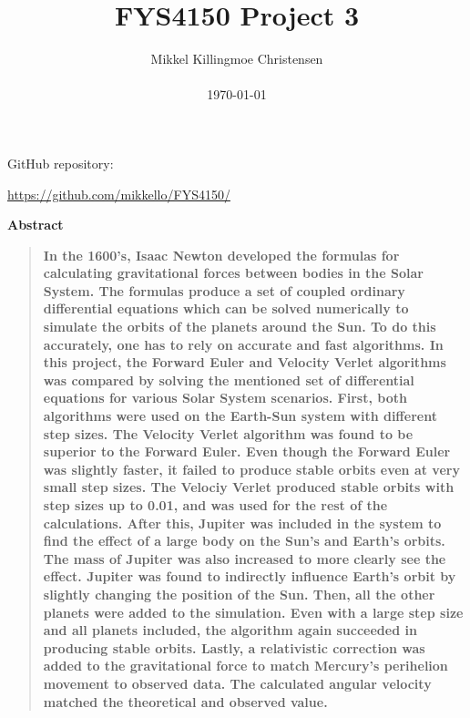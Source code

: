 \documentclass[10pt,a4paper,titlepage]{article}
\title{FYS4150 Project 3}
\author
{Mikkel Killingmoe Christensen\\
\\
\normalsize{\today}
}
\date{}
\newenvironment{sciabstract}{%
\begin{quote} \bf}
{\end{quote}}
\begin{document}
 




\maketitle 
\begin{center}
\par GitHub repository:
\par \url{https://github.com/mikkello/FYS4150/}
\end{center}



\begin{center}
{\large \textbf{Abstract}}
\end{center}
\begin{sciabstract}
In the 1600's, Isaac Newton developed the formulas for calculating gravitational forces between bodies in the Solar System. The formulas produce a set of coupled ordinary differential equations which can be solved numerically to simulate the orbits of the planets around the Sun. To do this accurately, one has to rely on accurate and fast algorithms. In this project, the Forward Euler and Velocity Verlet algorithms was compared by solving the mentioned set of differential equations for various Solar System scenarios. First, both algorithms were used on the Earth-Sun system with different step sizes. The Velocity Verlet algorithm was found to be superior to the Forward Euler. Even though the Forward Euler was slightly faster, it failed to produce stable orbits even at very small step sizes. The Velociy Verlet produced stable orbits with step sizes up to 0.01, and was used for the rest of the calculations.  After this, Jupiter was included in the system to find the effect of a large body on the Sun's and Earth's orbits. The mass of Jupiter was also increased to more clearly see the effect. Jupiter was found to indirectly influence Earth's orbit by slightly changing the position of the Sun. Then, all the other planets were added to the simulation. Even with a large step size and all planets included, the algorithm again succeeded in producing stable orbits. Lastly, a relativistic correction was added to the gravitational force to match Mercury's perihelion movement to observed data. The calculated angular velocity matched the theoretical and observed value. 
\end{sciabstract}
\end{document}
